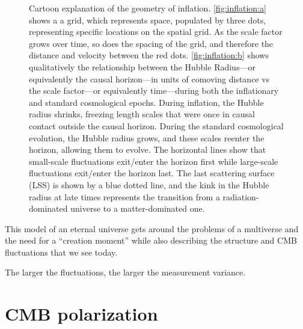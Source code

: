 \begin{figure}[!ht]
    \centering
    \hfill
    \caption[Cartoon depiction of the scale factor and how inflation it and comoving distance]{Cartoon explanation of the geometry of inflation. \ref{fig:inflation:a} shows a a grid, which represents space, populated by three dots, representing specific locations on the spatial grid. As the scale factor grows over time, so does the spacing of the grid, and therefore the distance and velocity between the red dots. \ref{fig:inflation:b} shows qualitatively the relationship between the Hubble Radius---or equivalently the causal horizon---in units of comoving distance vs the scale factor---or equivalently time---during both the inflationary and standard cosmological epochs. During inflation, the Hubble radius shrinks, freezing length scales that were once in causal contact outside the causal horizon. During the standard cosmological evolution, the Hubble radius grows, and these scales reenter the horizon, allowing them to evolve. The horizontal lines show that small-scale fluctuations exit/enter the horizon first while large-scale fluctuations exit/enter the horizon last. The last scattering surface (LSS) is shown by a blue dotted line, and the kink in the Hubble radius at late times represents the transition from a radiation-dominated universe to a matter-dominated one.}
    \label{fig:inflation}
\end{figure}

This model of an eternal universe gets around the problems of a multiverse and the need for a ``creation moment'' while also describing the structure and CMB fluctuations that we see today.

The larger the fluctuations, the larger the measurement variance.


\section{CMB polarization}
\label{sec:cmb_polarization}


